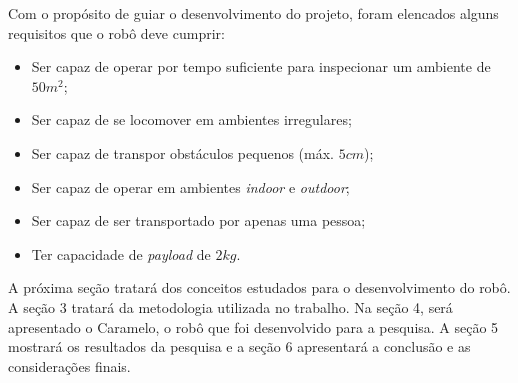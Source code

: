 \documentclass[../main.tex]{subfiles}
\begin{document}
Com o propósito de guiar o desenvolvimento do projeto, foram elencados alguns requisitos que o robô deve cumprir:

\begin{itemize}[noitemsep]
  \item Ser capaz de operar por tempo suficiente para inspecionar um ambiente de $50m^2$;
  \item Ser capaz de se locomover em ambientes irregulares;
  \item Ser capaz de transpor obstáculos pequenos (máx. $5cm$);
  \item Ser capaz de operar em ambientes \textit{indoor} e \textit{outdoor};
  \item Ser capaz de ser transportado por apenas uma pessoa;
  \item Ter capacidade de \textit{payload} de $2kg$.
\end{itemize}

A próxima seção tratará dos conceitos estudados para o desenvolvimento do robô. A seção 3 tratará da metodologia utilizada no trabalho. Na seção 4, será apresentado o Caramelo, o robô que foi desenvolvido para a pesquisa. A seção 5 mostrará os resultados da pesquisa e a seção 6 apresentará a conclusão e as considerações finais.  
\end{document}
